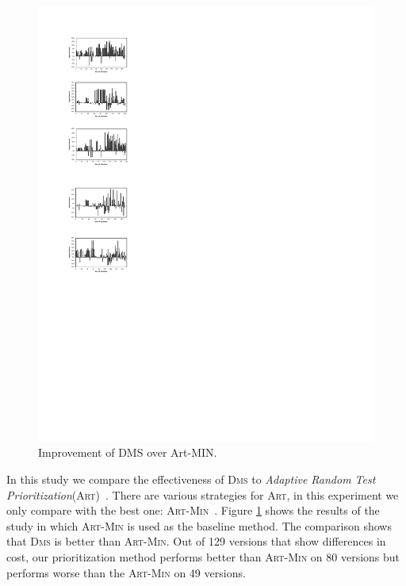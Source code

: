 \begin{figure}[tbp]
    \centering
    \includegraphics[width=12cm]{our_vs_artmin.pdf}
    \caption{Improvement of D{\scriptsize MS} over A{\scriptsize rt}-M{\scriptsize IN}.}
    \label{fig:our_vs_artmin}
\end{figure}

\vspace{0.2cm}
 In this study we compare the effectiveness of \textsc{Dms} to {\em Adaptive Random Test Prioritization}(\textsc{Art})~\citep{JiangZCT09}.
There are various strategies for \textsc{Art}, in this experiment we only compare with the best one: \textsc{Art-Min}~\citep{JiangZCT09, Gonzalez-SanchezPAGG11, Alberto2011}.
Figure \ref{fig:our_vs_artmin} shows the results of the study in which \textsc{Art-Min} is used
as the baseline method. The comparison shows that \textsc{Dms} is better than \textsc{Art-Min}.
Out of 129 versions that show differences in cost, our prioritization method performs
better than \textsc{Art-Min} on 80 versions but performs worse than the
\textsc{Art-Min} on 49 versions.

